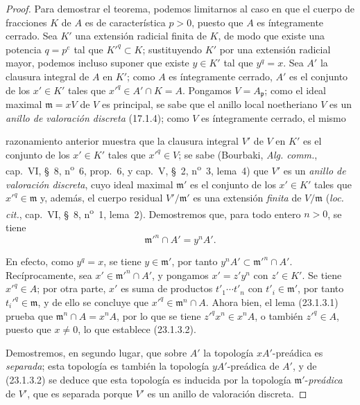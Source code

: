 \begin{proof}
Para demostrar el teorema, podemos limitarnos al caso en que el cuerpo de fracciones
$K$ de $A$ es de característica $p>0$, puesto que $A$ es íntegramente cerrado.
Sea $K'$ una extensión radicial finita de $K$, de modo que existe una
potencia $q=p^e$ tal que $K'^q\subset K$; sustituyendo $K'$ por una
extensión radicial mayor, podemos incluso suponer que existe $y\in K'$ tal
que $y^q=x$. Sea $A'$ la clausura integral de $A$ en $K'$; como
$A$ es íntegramente cerrado, $A'$ es el conjunto de los $x'\in K'$ tales que
$x'^q\in A'\cap K=A$. Pongamos $V=A_{\mathfrak p}$; como el ideal maximal
$\mathfrak m=xV$ de $V$ es principal, se sabe que el anillo local
noetheriano $V$ es un \emph{anillo de valoración discreta} (17.1.4); como
$V$ es íntegramente cerrado, el mismo


razonamiento anterior muestra que la clausura integral $V'$ de $V$ en
$K'$ es el conjunto de los $x'\in K'$ tales que $x'^q\in V$; se sabe
(Bourbaki, \emph{Alg. comm.}, cap.~VI, §~8, n\textsuperscript{o}~6,
prop.~6, y cap.~V, §~2, n\textsuperscript{o}~3, lema~4) que $V'$ es un
\emph{anillo de valoración discreta}, cuyo ideal maximal $\mathfrak m'$ es
el conjunto de los $x'\in K'$ tales que $x'^q\in\mathfrak m$ y, además, el cuerpo
residual $V'/\mathfrak m'$ es una extensión \emph{finita} de
$V/\mathfrak m$ (\emph{loc. cit.}, cap.~VI, §~8,
n\textsuperscript{o}~1, lema~2). Demostremos que, para todo entero $n>0$, se tiene
\begin{equation}
\label{0.23.1.3.2-es}
  \mathfrak m'^n\cap A'=y^nA'.
  \tag{23.1.3.2}
\end{equation}

En efecto, como $y^q=x$, se tiene $y\in\mathfrak m'$, por tanto
$y^nA'\subset\mathfrak m'^n\cap A'$. Recíprocamente, sea
$x'\in\mathfrak m'^n\cap A'$, y pongamos $x'=z'y^n$ con $z'\in K'$. Se tiene
$x'^q\in A$; por otra parte, $x'$ es suma de productos
$t'_1\cdots t'_n$ con $t'_i\in\mathfrak m'$, por tanto
$t_i'^q\in\mathfrak m$, y de ello se concluye que
$x'^q\in\mathfrak m^n\cap A$. Ahora bien, el lema (23.1.3.1) prueba que
$\mathfrak m^n\cap A=x^nA$, por lo que se tiene $z'^qx^n\in x^nA$, o también
$z'^q\in A$, puesto que $x\neq0$, lo que establece (23.1.3.2).

Demostremos, en segundo lugar, que sobre $A'$ la topología $xA'$-preádica es
\emph{separada}; esta topología es también la topología $yA'$-preádica de
$A'$, y de (23.1.3.2) se deduce que esta topología es inducida por la
topología $\mathfrak m'$-\emph{preádica} de $V'$, que es separada porque $V'$ es
un anillo de valoración discreta.


\end{proof}
